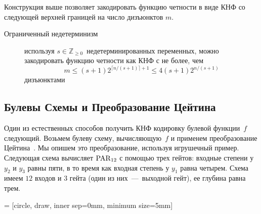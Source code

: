 Конструкция выше позволяет закодировать функцию четности в виде КНФ со следующей верхней границей на число дизъюнктов $m$.
\begin{description}
	\item[Ограниченный недетерминизм] используя $s \in \mathbb{Z}_{\ge 0}$~недетерминированных переменных, можно закодировать функцию четности 
	как КНФ с не более, чем 
	\begin{equation}\label{eq:upperm}
		m \le (s+1)2^{\lceil n/(s+1) \rceil+1} \le 4(s+1)2^{n/(s+1)}
	\end{equation}
	дизъюнктами
\end{description}
	

\subsection{Булевы Схемы и Преобразование Цейтина}\label{sec:tseitin}
Один из естественных способов получить КНФ кодировку булевой функции~$f$ следующий.
Возьмем булеву схему, вычисляющую~$f$ и применем преобразование Цейтина~\cite{zbMATH03325539}.
Мы опишем это преобразование, используя игрушечный пример.
Следующая схема вычисляет  $\operatorname{PAR}_{12}$ с помощью трех гейтов:
входные степени у $y_2$ и $y_3$ равны пяти, в то время как входная степень у $y_1$ равна четырем.
Схема имеем $12$ входов и $3$ гейта (один из них~---~выходной гейт), ее глубина равна трем.

 = [circle, draw, inner sep=0mm, minimum size=5mm]

